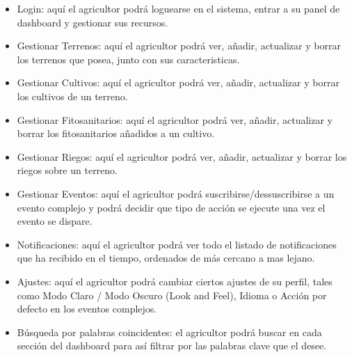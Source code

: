 \begin{itemize}
    \item Login: aquí el agricultor podrá loguearse en el sistema, entrar a su panel de dashboard y gestionar sus recursos.
    \item Gestionar Terrenos: aquí el agricultor podrá ver, añadir, actualizar y borrar los terrenos que posea, junto con sus caracteristicas.
    \item Gestionar Cultivos: aquí el agricultor podrá ver, añadir, actualizar y borrar los cultivos de un terreno.
    \item Gestionar Fitosanitarios: aquí el agricultor podrá ver, añadir, actualizar y borrar los fitosanitarios añadidos a un cultivo.
    \item Gestionar Riegos: aquí el agricultor podrá ver, añadir, actualizar y borrar los riegos sobre un terreno.
    \item Gestionar Eventos: aquí el agricultor podrá suscribirse/dessuscribirse a un evento complejo y podrá decidir que tipo de acción se ejecute una vez el evento se dispare.
    \item Notificaciones: aquí el agricultor podrá ver todo el listado de notificaciones que ha recibido en el tiempo, ordenados de más cercano a mas lejano.
    \item Ajustes: aquí el agricultor podrá cambiar ciertos ajustes de su perfil, tales como Modo Claro / Modo Oscuro (Look and Feel), Idioma o Acción por defecto en los eventos complejos.
    \item Búsqueda por palabras coincidentes: el agricultor podrá buscar en cada sección del dashboard para así filtrar por las palabras clave que el desee.
\end{itemize}

